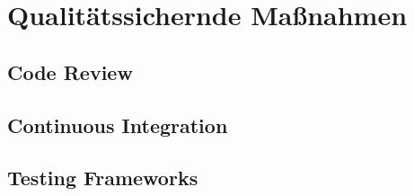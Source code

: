 	\section{Qualitätssichernde Maßnahmen}
	
		\subsection{Code Review}
		
	
		\subsection{Continuous Integration}
		
		\subsection{Testing Frameworks}
		
	